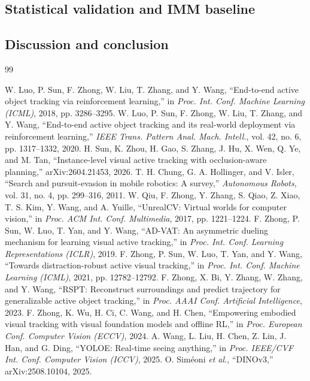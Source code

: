 \documentclass[12pt,a4paper]{article}
\begin{document}
\subsection{Statistical validation and IMM baseline}
\subsection{Discussion and conclusion}
\clearpage
\begin{thebibliography}{99}
 W. Luo, P. Sun, F. Zhong, W. Liu, T. Zhang, and Y. Wang, ``End-to-end active object tracking via reinforcement learning,'' in \emph{Proc. Int. Conf. Machine Learning (ICML)}, 2018, pp. 3286–3295.
 W. Luo, P. Sun, F. Zhong, W. Liu, T. Zhang, and Y. Wang, ``End-to-end active object tracking and its real-world deployment via reinforcement learning,'' \emph{IEEE Trans. Pattern Anal. Mach. Intell.}, vol. 42, no. 6, pp. 1317–1332, 2020.
 H. Sun, K. Zhou, H. Gao, S. Zhang, J. Hu, X. Wen, Q. Ye, and M. Tan, ``Instance-level visual active tracking with occlusion-aware planning,'' arXiv:2604.21453, 2026.
 T. H. Chung, G. A. Hollinger, and V. Isler, ``Search and pursuit-evasion in mobile robotics: A survey,'' \emph{Autonomous Robots}, vol. 31, no. 4, pp. 299–316, 2011.
 W. Qiu, F. Zhong, Y. Zhang, S. Qiao, Z. Xiao, T. S. Kim, Y. Wang, and A. Yuille, ``UnrealCV: Virtual worlds for computer vision,'' in \emph{Proc. ACM Int. Conf. Multimedia}, 2017, pp. 1221–1224.
 F. Zhong, P. Sun, W. Luo, T. Yan, and Y. Wang, ``AD-VAT: An asymmetric dueling mechanism for learning visual active tracking,'' in \emph{Proc. Int. Conf. Learning Representations (ICLR)}, 2019.
 F. Zhong, P. Sun, W. Luo, T. Yan, and Y. Wang, ``Towards distraction-robust active visual tracking,'' in \emph{Proc. Int. Conf. Machine Learning (ICML)}, 2021, pp. 12782–12792.
 F. Zhong, X. Bi, Y. Zhang, W. Zhang, and Y. Wang, ``RSPT: Reconstruct surroundings and predict trajectory for generalizable active object tracking,'' in \emph{Proc. AAAI Conf. Artificial Intelligence}, 2023.
 F. Zhong, K. Wu, H. Ci, C. Wang, and H. Chen, ``Empowering embodied visual tracking with visual foundation models and offline RL,'' in \emph{Proc. European Conf. Computer Vision (ECCV)}, 2024.
 A. Wang, L. Liu, H. Chen, Z. Lin, J. Han, and G. Ding, ``YOLOE: Real-time seeing anything,'' in \emph{Proc. IEEE/CVF Int. Conf. Computer Vision (ICCV)}, 2025.
 O. Siméoni \emph{et al.}, ``DINOv3,'' arXiv:2508.10104, 2025.

\end{thebibliography}
\end{document}
